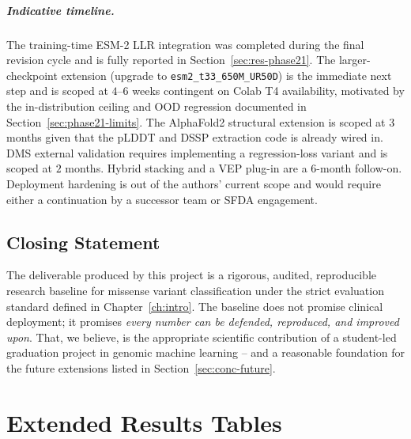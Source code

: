 \documentclass[11pt,a4paper,oneside]{report}
\begin{document}
\paragraph{Indicative timeline.} The training-time ESM-2 LLR
integration was completed during the final revision cycle
and is fully reported in Section~\ref{sec:res-phase21}. The
larger-checkpoint extension (upgrade to
\texttt{esm2\_t33\_650M\_UR50D}) is the immediate next step
and is scoped at $4$--$6$ weeks contingent on Colab T4
availability, motivated by the in-distribution ceiling and
OOD regression documented in
Section~\ref{sec:phase21-limits}. The AlphaFold2 structural
extension is scoped at $3$ months given that the pLDDT and
DSSP extraction code is already wired in. DMS external
validation requires implementing a regression-loss variant
and is scoped at $2$ months. Hybrid stacking and a VEP
plug-in are a $6$-month follow-on. Deployment hardening is
out of the authors' current scope and would require either a
continuation by a successor team or SFDA engagement.

\section{Closing Statement}
\label{sec:conc-closing}

The deliverable produced by this project is a rigorous,
audited, reproducible research baseline for missense
variant classification under the strict evaluation
standard defined in Chapter~\ref{ch:intro}. The baseline
does not promise clinical deployment; it promises
\emph{every number can be defended, reproduced, and
improved upon}. That, we believe, is the appropriate
scientific contribution of a student-led graduation
project in genomic machine learning -- and a reasonable
foundation for the future extensions listed in
Section~\ref{sec:conc-future}.

\clearpage





\appendix

\chapter{Extended Results Tables}
\label{app:tables}
\end{document}
